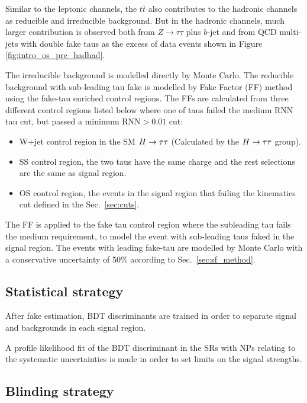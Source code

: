 Similar to the leptonic channels, the $t\bar{t}$ also contributes to the hadronic channels as reducible and irreducible background. But in the hadronic channels, much larger contribution is observed both from $Z\to \tau\tau$ plus $b$-jet and from QCD multi-jets  with double fake taus as the excess of data events shown in Figure \ref{fig:intro_os_pre_hadhad}. 



The irreducible background is modelled directly by Monte Carlo. The reducible background with sub-leading tau fake is modelled by Fake Factor (FF) method using the
fake-tau enriched control regions. The FFs are calculated from three different control regions listed below where one of taus failed the medium RNN tau cut, but passed
a minimum RNN$>0.01$ cut:

\begin{itemize}
	\item W+jet control region in the SM $H \rightarrow \tau\tau$ (Calculated by the $H \rightarrow \tau\tau$ group).
	\item SS control region, the two taus have the same charge and the rest selections are the same as signal region.
	\item OS control region, the events in the signal region that failing the kinematics cut defined in the Sec.~\ref{sec:cuts}.
\end{itemize}

The FF is applied to the fake tau control region where the subleading tau fails the medium requirement, to model the event with sub-leading taus faked in the signal region. The events with leading fake-tau are modelled by Monte Carlo with a conservative uncertainty of 50\% according to Sec.~\ref{sec:sf_method}.

\subsection{Statistical strategy}
\label{sec:statStrategy}

After fake estimation, BDT discriminants are trained in order to separate signal and backgrounds in each signal region.

A profile likelihood fit of the BDT discriminant in the SRs with NPs relating to the systematic uncertainties is made in order to set limits on the signal strengths.

\subsection{Blinding strategy}
\label{sec:blind}

